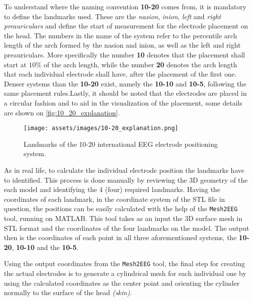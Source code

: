 To understand where the naming convention \textbf{10-20} comes from, it is mandatory to define the landmarks used. These are the \textit{\gls{nasion}}, \textit{\gls{inion}}, \textit{left} and \textit{right \gls{preauricular}s} and define the start of measurement for the electrode placement on the head. The numbers in the name of the system refer to the percentile arch length of the arch formed by the \gls{nasion} and \gls{inion}, as well as the left and right \gls{preauricular}s. More specifically the number \textbf{10} denotes that the placement shall start at $10\%$ of the arch length, while the number \textbf{20} denotes the arch length that each individual electrode shall have, after the placement of the first one. Denser systems than the \textbf{10-20} exist, namely the \textbf{10-10} and \textbf{10-5}, following the same placement rules.Lastly, it should be noted that the electrodes are placed in a circular fashion and to aid in the visualization of the placement, some details are shown on \autoref{fig:10_20_explanation}.

\begin{figure}[H]
    \centering
    \texttt{[image: assets/images/10-20\_explanation.png]}
    \caption[Landmarks of the 10-20 international \gls{EEG} electrode positioning system]{Landmarks of the 10-20 international \gls{EEG} electrode positioning system. \cite[figure 13.2, p.368]{Malmivuo1995}}
    \label{fig:10_20_explanation}
\end{figure}

As in real life, to calculate the individual electrode position the landmarks have to identified. This process is done manually by reviewing the 3D geometry of the each model and identifying the 4 (four) required landmarks. Having the coordinates of each landmark, in the coordinate system of the \gls{STL} file in question, the positions can be easily calculated with the help of the \texttt{Mesh2EEG} \cite{Giacometti2014} tool, running on \gls{MATLAB}. This tool takes as an input the 3D surface mesh in \gls{STL} format and the coordinates of the four landmarks on the model. The output then is the coordinates of each point in all three aforementioned systems, the \textbf{10-20}, \textbf{10-10} and the \textbf{10-5}.

Using the output coordinates from the \texttt{Mesh2EEG} \cite{Giacometti2014} tool, the final step for creating the actual electrodes is to generate a cylindrical mesh for each individual one by using the calculated coordinates as the center point and orienting the cylinder normally to the surface of the head \textit{(skin)}.
\\\vspace{1pt}

